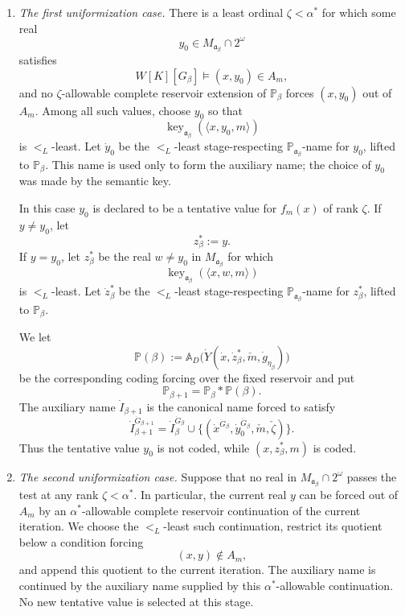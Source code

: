 \documentclass[a4paper,11pt]{article}
\newcommand{\forceP}{\mathbb{P}}
\newcommand{\key}{\operatorname{key}}
\begin{document}
\begin{enumerate}
\item[(1)] \emph{The first uniformization case.}
There is a least ordinal $\zeta<\alpha^\ast$ for which some real
\[
   y_0\in M_{\mathfrak a_\beta}\cap2^\omega
\]
satisfies
\[
   W[K][G_\beta]\models(x,y_0)\in A_m,
\]
and no $\zeta$-allowable complete reservoir extension of $\forceP_\beta$
forces $(x,y_0)$ out of $A_m$.  Among all such values, choose $y_0$ so that
\[
   \key_{\mathfrak a_\beta}(\langle x,y_0,m\rangle)
\]
is $<_L$-least.  Let $\dot y_0$ be the $<_L$-least stage-respecting
$\forceP_{\mathfrak a_\beta}$-name for $y_0$, lifted to $\forceP_\beta$.
This name is used only to form the auxiliary name; the choice of $y_0$ was
made by the semantic key.

In this case $y_0$ is declared to be a tentative value for $f_m(x)$ of rank
$\zeta$.  If $y\neq y_0$, let
\[
   z_\beta^*:=y.
\]
If $y=y_0$, let $z_\beta^*$ be the real $w\neq y_0$ in
$M_{\mathfrak a_\beta}$ for which
\[
   \key_{\mathfrak a_\beta}(\langle x,w,m\rangle)
\]
is $<_L$-least.  Let $\dot z_\beta^*$ be the $<_L$-least stage-respecting
$\forceP_{\mathfrak a_\beta}$-name for $z_\beta^*$, lifted to
$\forceP_\beta$.

We let
\[
   \forceP(\beta)
   :=\mathbb A_D\bigl(
      \dot Y(\dot x,\dot z_\beta^*,\check m,\dot g_{\eta_\beta})
   \bigr)
\]
be the corresponding coding forcing over the fixed reservoir and put
\[
   \forceP_{\beta+1}=\forceP_\beta*\forceP(\beta).
\]
The auxiliary name $\dot I_{\beta+1}$ is the canonical name forced to satisfy
\[
   \dot I_{\beta+1}^{\dot G_{\beta+1}}
   =
   \dot I_\beta^{\dot G_\beta}
   \cup
   \{(\dot x^{\dot G_\beta},
       \dot y_0^{\dot G_\beta},
       \check m,\check\zeta)\}.
\]
Thus the tentative value $y_0$ is not coded, while
$(x,z_\beta^*,m)$ is coded.

\item[(2)] \emph{The second uniformization case.}
Suppose that no real in $M_{\mathfrak a_\beta}\cap2^\omega$ passes the test
at any rank $\zeta<\alpha^\ast$.  In particular, the current real $y$ can be
forced out of $A_m$ by an $\alpha^\ast$-allowable complete reservoir
continuation of the current iteration.  We choose the $<_L$-least such
continuation, restrict its quotient below a condition forcing
\[
   (x,y)\notin A_m,
\]
and append this quotient to the current iteration.  The auxiliary name is
continued by the auxiliary name supplied by this $\alpha^\ast$-allowable
continuation.  No new tentative value is selected at this stage.
\end{enumerate}
\end{document}
